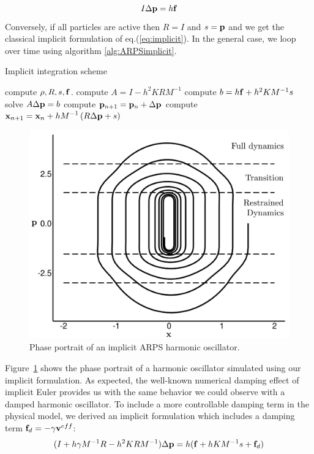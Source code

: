\begin{equation}
    \label{eq:ARPSImplicitRestrained}
    I \Delta \mathbf{p} = h \mathbf{f}
\end{equation}
Conversely, if all particles are active then $R = I$ and $s = \mathbf{p}$ and we get the classical implicit formulation of eq.(\ref{eq:implicit}).
In the general case, we loop over time using algorithm \ref{alg:ARPSimplicit}.
\begin{algorithm}[H]
    \caption[ARPS: Implicit integration scheme]{Implicit integration scheme}
    \label{alg:ARPSimplicit}
    \begin{algorithmic}[10]
	    \State compute $\rho, R, s, \mathbf{f}$.
	    \State compute $A = I - h^{2}KRM^{-1}$
	    \State compute $b = h \mathbf{f} + h^{2}KM^{-1}s$
	    \State solve $A \Delta \mathbf{p} = b$
            \State compute $\mathbf{p}_{n+1} = \mathbf{p}_{n} + \Delta \mathbf{p}$
	    \State compute $\displaystyle \mathbf{x}_{n+1} = \mathbf{x}_{n} +
            hM^{-1}\left( R\Delta \mathbf{p}+ s \right)$
	\EndFor
    \end{algorithmic}
\end{algorithm}
\begin{figure}[htb]
  \centering
  \includegraphics[width=0.8\linewidth]{images/arps-vriphys2013/implicitHOPPraw_hacked.png}
  \caption[ARPS: Phase portrait of an implicit ARPS harmonic oscillator]{\label{fig:implicitHOPP} Phase portrait of an implicit ARPS harmonic oscillator.}
\end{figure}

Figure~\ref{fig:implicitHOPP} shows the phase portrait of a harmonic oscillator simulated using our implicit formulation.
As expected, the well-known numerical damping effect of implicit Euler provides us with the same behavior we could observe with a damped harmonic oscillator.
To include a more controllable damping term in the physical model, we derived an implicit formulation which includes a damping term $\mathbf{f}_{d} = -\gamma \mathbf{v}^{eff}$:
\begin{equation}
	\label{eq:arpsLinearSystemDamped}
	( I + h\gamma M^{-1}R -h^{2}KRM^{-1} ) \Delta \mathbf{p} = h( \mathbf{f} + h KM^{-1}s + \mathbf{f}_{d})
\end{equation}
